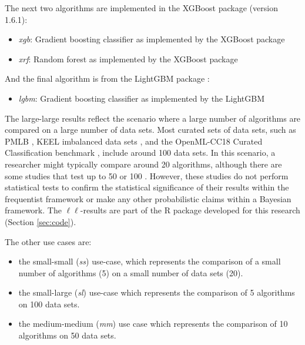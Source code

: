\documentclass[twoside,11pt,preprint]{article}
\def\tightlist{}
\begin{document}
The next two algorithms are implemented in the XGBoost package \citep{Chen:2016:XST:2939672.2939785} (version 1.6.1):

\begin{itemize}
\tightlist
\item
  \emph{xgb}: Gradient boosting classifier as implemented by the XGBoost package
\item
  \emph{xrf}: Random forest as implemented by the XGBoost package
\end{itemize}

And the final algorithm is from the LightGBM package \citep{ke2017lightgbm} :

\begin{itemize}
\tightlist
\item
  \emph{lgbm}: Gradient boosting classifier as implemented by the LightGBM
\end{itemize}

The large-large results reflect the scenario where a large number of algorithms are compared on a large number of data sets. Most curated sets of data sets, such as PMLB \citep{Olson2017PMLB}, KEEL imbalanced data sets \citep{alcala2011keel}, and the OpenML-CC18 Curated Classification benchmark \citep{oml-benchmarking-suites}, include around 100 data sets. In this scenario, a researcher might typically compare around 20 algorithms, although there are some studies that test up to 50 \citep{wainer2021tune} or 100 \citep{fernandez2014we, wang2021comparing}. However, these studies do not perform statistical tests to confirm the statistical significance of their results within the frequentist framework or make any other probabilistic claims within a Bayesian framework. The $\ell\ell$-results are part of the R package developed for this research (Section \ref{sec:code}).

The other use cases are:

\begin{itemize}
\tightlist
\item
  the small-small (\emph{ss}) use-case, which represents the comparison of a small number of algorithms (5) on a small number of data sets (20).
\item
  the small-large (\emph{sl}) use-case which represents the comparison of 5 algorithms on 100 data sets.
\item
  the medium-medium (\emph{mm}) use case which represents the comparison of 10 algorithms on 50 data sets.
\end{itemize}
\end{document}
